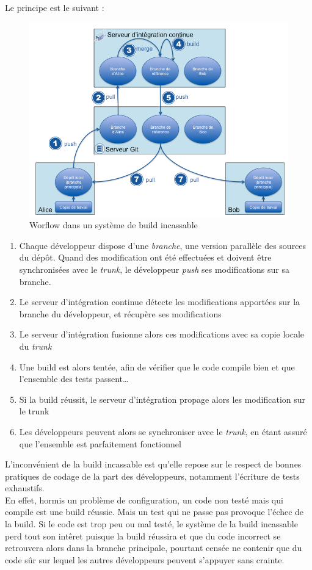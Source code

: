Le principe est le suivant :\\
\begin{figure}
	\centering
		\includegraphics[scale=0.5]{build_incassable.png}
	\caption{Worflow dans un système de build incassable}
\end{figure}

\begin{enumerate}
	\item Chaque développeur dispose d'une \textit{branche}, une version parallèle des sources du dépôt. Quand des modification ont été effectuées et doivent être synchronisées avec le \textit{trunk}, le développeur \textit{push} ses modifications sur sa branche.
	\item Le serveur d'intégration continue détecte les modifications apportées sur la branche du développeur, et récupère ses modifications
	\item	Le serveur d'intégration fusionne alors ces modifications avec sa copie locale du \textit{trunk}
	\item Une build est alors tentée, afin de vérifier que le code compile bien et que l'ensemble des tests passent\ldots
	\item Si la build réussit, le serveur d'intégration propage alors les modification sur le trunk
	\item Les développeurs peuvent alors se synchroniser avec le \textit{trunk}, en étant assuré que l'ensemble est parfaitement fonctionnel
\end{enumerate}
L'inconvénient de la build incassable est qu'elle repose sur le respect de bonnes pratiques de codage de la part des développeurs, notamment l'écriture de tests exhaustifs.\\
En effet, hormis un problème de configuration, un code non testé mais qui compile est une build réussie. Mais un test qui ne passe pas provoque l'échec de la build. Si le code est trop peu ou mal testé, le système de la build incassable perd tout son intêret puisque la build réussira et que du code \og incorrect  \fg{} se retrouvera alors dans la branche principale, pourtant censée ne contenir que du code sûr sur lequel les autres développeurs peuvent s'appuyer sans crainte.  

